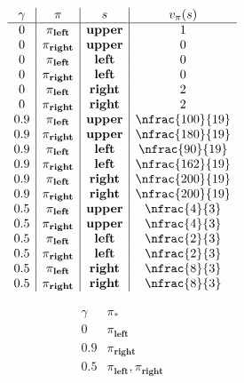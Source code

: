 \begin{solution}
\begin{align*}
    \begin{array}{c|c|c|c}
        \gamma & \pi                & s              & v_\pi(s)        \\ \hline
        0      & \pi_\textbf{left}  & \textbf{upper} & 1               \\
        0      & \pi_\textbf{right} & \textbf{upper} & 0               \\
        0      & \pi_\textbf{left}  & \textbf{left}  & 0               \\
        0      & \pi_\textbf{right} & \textbf{left}  & 0               \\
        0      & \pi_\textbf{left}  & \textbf{right} & 2               \\
        0      & \pi_\textbf{right} & \textbf{right} & 2               \\
        0.9    & \pi_\textbf{left}  & \textbf{upper} & \nfrac{100}{19} \\
        0.9    & \pi_\textbf{right} & \textbf{upper} & \nfrac{180}{19} \\
        0.9    & \pi_\textbf{left}  & \textbf{left}  & \nfrac{90} {19} \\
        0.9    & \pi_\textbf{right} & \textbf{left}  & \nfrac{162}{19} \\
        0.9    & \pi_\textbf{left}  & \textbf{right} & \nfrac{200}{19} \\
        0.9    & \pi_\textbf{right} & \textbf{right} & \nfrac{200}{19} \\
        0.5    & \pi_\textbf{left}  & \textbf{upper} & \nfrac{4}{3}    \\
        0.5    & \pi_\textbf{right} & \textbf{upper} & \nfrac{4}{3}    \\
        0.5    & \pi_\textbf{left}  & \textbf{left}  & \nfrac{2}{3}    \\
        0.5    & \pi_\textbf{right} & \textbf{left}  & \nfrac{2}{3}    \\
        0.5    & \pi_\textbf{left}  & \textbf{right} & \nfrac{8}{3}    \\
        0.5    & \pi_\textbf{right} & \textbf{right} & \nfrac{8}{3}    \\
    \end{array}
\end{align*}

\begin{align*}
    \begin{array}{c|c}
        \gamma & \pi_\ast                           \\ \hline
        0   & \pi_\textbf{left}                     \\
        0.9 & \pi_\textbf{right}                    \\
        0.5 & \pi_\textbf{left}, \pi_\textbf{right} \\
    \end{array}
\end{align*}

\end{solution}

